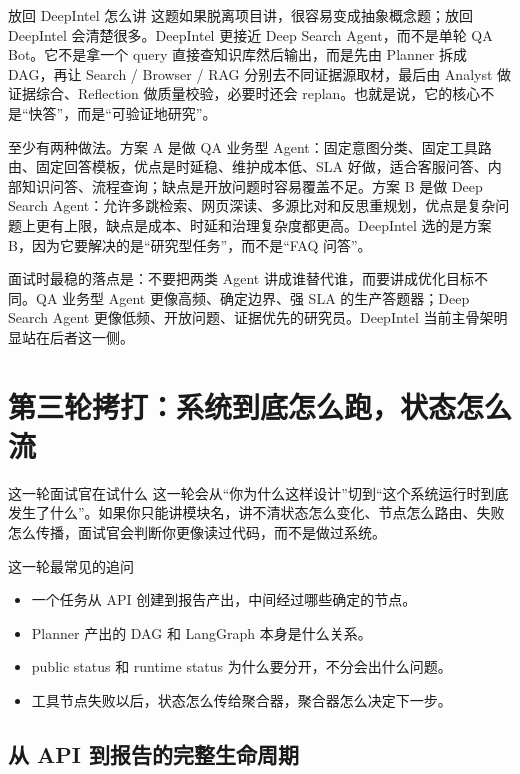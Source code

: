 \documentclass[12pt]{article}
\begin{document}
\begin{analysisBox}{放回 DeepIntel 怎么讲}
这题如果脱离项目讲，很容易变成抽象概念题；放回 DeepIntel 会清楚很多。DeepIntel 更接近 Deep Search Agent，而不是单轮 QA Bot。它不是拿一个 query 直接查知识库然后输出，而是先由 Planner 拆成 DAG，再让 Search / Browser / RAG 分别去不同证据源取材，最后由 Analyst 做证据综合、Reflection 做质量校验，必要时还会 replan。也就是说，它的核心不是“快答”，而是“可验证地研究”。

至少有两种做法。方案 A 是做 QA 业务型 Agent：固定意图分类、固定工具路由、固定回答模板，优点是时延稳、维护成本低、SLA 好做，适合客服问答、内部知识问答、流程查询；缺点是开放问题时容易覆盖不足。方案 B 是做 Deep Search Agent：允许多跳检索、网页深读、多源比对和反思重规划，优点是复杂问题上更有上限，缺点是成本、时延和治理复杂度都更高。DeepIntel 选的是方案 B，因为它要解决的是“研究型任务”，而不是“FAQ 问答”。

面试时最稳的落点是：不要把两类 Agent 讲成谁替代谁，而要讲成优化目标不同。QA 业务型 Agent 更像高频、确定边界、强 SLA 的生产答题器；Deep Search Agent 更像低频、开放问题、证据优先的研究员。DeepIntel 当前主骨架明显站在后者这一侧。
\end{analysisBox}

\section{第三轮拷打：系统到底怎么跑，状态怎么流}

\begin{summaryBox}{这一轮面试官在试什么}
这一轮会从“你为什么这样设计”切到“这个系统运行时到底发生了什么”。如果你只能讲模块名，讲不清状态怎么变化、节点怎么路由、失败怎么传播，面试官会判断你更像读过代码，而不是做过系统。
\end{summaryBox}

\begin{qaBox}{这一轮最常见的追问}
\begin{itemize}[leftmargin=2em]
  \item 一个任务从 API 创建到报告产出，中间经过哪些确定的节点。
  \item Planner 产出的 DAG 和 LangGraph 本身是什么关系。
  \item public status 和 runtime status 为什么要分开，不分会出什么问题。
  \item 工具节点失败以后，状态怎么传给聚合器，聚合器怎么决定下一步。
\end{itemize}
\end{qaBox}

\subsection{从 API 到报告的完整生命周期}
\begin{center}

\end{center}
\end{document}
